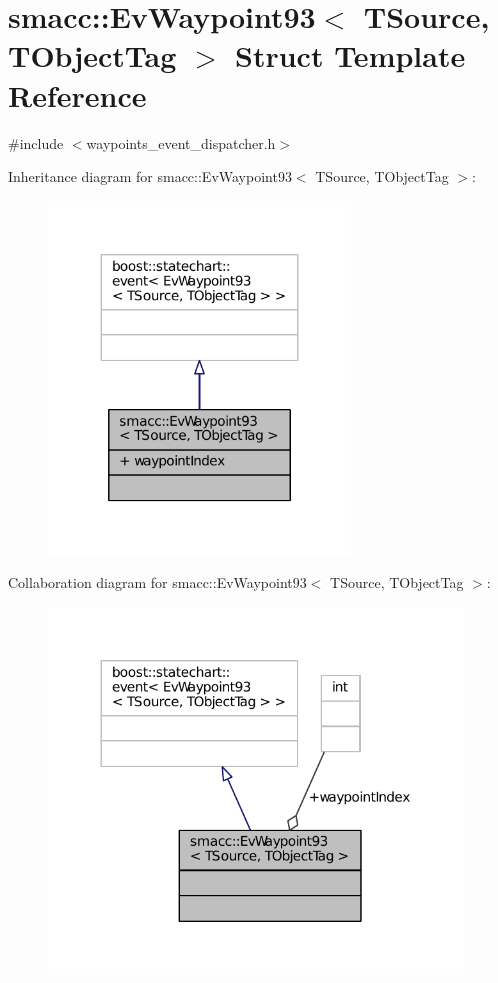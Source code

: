 \hypertarget{structsmacc_1_1EvWaypoint93}{}\section{smacc\+:\+:Ev\+Waypoint93$<$ T\+Source, T\+Object\+Tag $>$ Struct Template Reference}
\label{structsmacc_1_1EvWaypoint93}


{\ttfamily \#include $<$waypoints\+\_\+event\+\_\+dispatcher.\+h$>$}



Inheritance diagram for smacc\+:\+:Ev\+Waypoint93$<$ T\+Source, T\+Object\+Tag $>$\+:
\nopagebreak
\begin{figure}[H]
\begin{center}
\leavevmode
\includegraphics[width=227pt]{structsmacc_1_1EvWaypoint93__inherit__graph}
\end{center}
\end{figure}


Collaboration diagram for smacc\+:\+:Ev\+Waypoint93$<$ T\+Source, T\+Object\+Tag $>$\+:
\nopagebreak
\begin{figure}[H]
\begin{center}
\leavevmode
\includegraphics[width=312pt]{structsmacc_1_1EvWaypoint93__coll__graph}
\end{center}
\end{figure}
